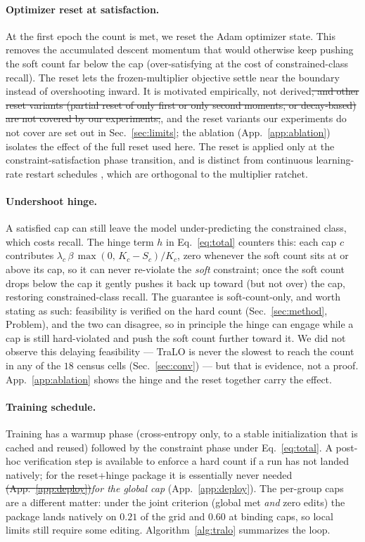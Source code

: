 \documentclass[10pt]{article}
\newcommand{\del}[1]{{\color{red}\sout{#1}}}
\begin{document}
\paragraph{Optimizer reset at satisfaction.}
At the first epoch the count is met, we reset the Adam optimizer state. This
removes the accumulated descent momentum that would otherwise keep pushing
the soft count far below the cap (over-satisfying at the cost of
constrained-class recall). The reset lets the frozen-multiplier objective
settle near the boundary instead of overshooting inward. It is motivated
empirically, not derived\del{, and other reset variants (partial reset of only
first or only second moments, or decay-based) are not covered by our
experiments;}{\color{blue}, and the reset variants our experiments do not cover
are set out in Sec.~\ref{sec:limits};} the ablation (App.~\ref{app:ablation}) isolates the effect of
the full reset used here. The reset is applied only at the
constraint-satisfaction phase transition, and is distinct from continuous
learning-rate restart schedules \citep{loshchilov2017sgdr}, which are
orthogonal to the multiplier ratchet.

\paragraph{Undershoot hinge.}
A satisfied cap can still leave the model under-predicting the constrained
class, which costs recall. The hinge term $h$ in Eq.~\eqref{eq:total}
counters this: each cap $c$ contributes
$\lambda_c\,\beta\,\max(0,\,K_c-S_c)/K_c$, zero whenever the soft count sits
at or above its cap, so it can never re-violate
{\color{blue}the \emph{soft} constraint}; once the soft count drops
below the cap it gently pushes it back up toward (but not over) the cap,
restoring constrained-class recall.
{\color{blue}The guarantee is soft-count-only, and worth stating as such:
feasibility is verified on the hard count (Sec.~\ref{sec:method}, Problem), and
the two can disagree, so in principle the hinge can engage while a cap is still
hard-violated and push the soft count further toward it. We did not observe this
delaying feasibility --- TraLO is never the slowest to reach the count in any of
the $18$ census cells (Sec.~\ref{sec:conv}) --- but that is evidence, not a
proof.} App.~\ref{app:ablation} shows the hinge
and the reset together carry the effect.

\paragraph{Training schedule.}
Training has a warmup phase (cross-entropy only, to a stable initialization
that is cached and reused) followed by the constraint phase under
Eq.~\eqref{eq:total}. A post-hoc verification step is available to enforce a
hard count if a run has not landed natively; for the reset+hinge package it
is essentially never needed \del{(App.~\mbox{\ref{app:deploy}})}{\color{blue}\emph{for the
global cap} (App.~\ref{app:deploy}). The per-group caps are a different matter: under
the joint criterion (global met \emph{and} zero edits) the package lands natively on
$0.21$ of the grid and $0.60$ at binding caps, so local limits still require some
editing}. Algorithm~\ref{alg:tralo}
summarizes the loop.
\end{document}
